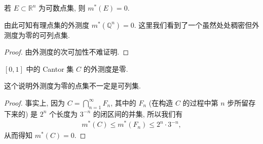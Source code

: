 \documentclass[../../main.tex]{subfiles}%
\begin{document}
\begin{corollary}
若 \(E \subset \mathbb{R}^n\) 为可数点集, 则 \(m^*(E) = 0\).
\end{corollary}
\begin{remark}
由此可知有理点集的外测度 \(m^*(\mathbb{Q}^n)=0\). 这里我们看到了一个虽然处处稠密但外测度为零的可列点集.
\end{remark}
\begin{proof}

由外测度的次可加性不难证明.

\end{proof}

\begin{proposition}\label{proposition:Cantor集的外测度是零}
\([0,1]\) 中的 Cantor 集 \(C\) 的外测度是零.
\end{proposition}
\begin{remark}
这个说明外测度为零的点集不一定是可列集.
\end{remark}
\begin{proof}

事实上, 因为 \(C = \bigcap_{n = 1}^{\infty} F_n\), 其中的 \(F_n\) (在构造 \(C\) 的过程中第 \(n\) 步所留存下来的) 是 \(2^n\) 个长度为 \(3^{-n}\) 的闭区间的并集, 所以我们有
\begin{align*}
m^*(C) \leqslant  m^*(F_n) \leqslant  2^n \cdot 3^{-n},
\end{align*}
从而得知 \(m^*(C)=0\). 

\end{proof}
\end{document}
